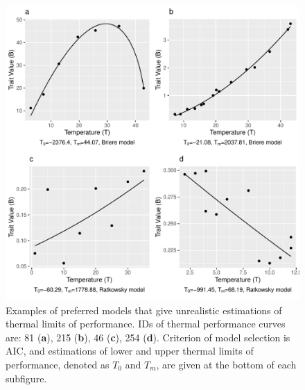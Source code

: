 \documentclass[11pt]{article}
\begin{document}
    \begin{figure}[H]
      \centering
      \includegraphics[width=\textwidth]{../Results/b.pdf}
      \caption{Examples of preferred models that give unrealistic estimations of thermal limits of performance. 
      IDs of thermal performance curves are: 81 (\textbf{a}), 
      215 (\textbf{b}), 46 (\textbf{c}), 254 (\textbf{d}). Criterion of model selection is AIC, and estimations of lower 
      and upper thermal limits of performance, denoted as $T_0$ and $T_m$, are given at the bottom of each subfigure.}
    \end{figure}

  
\end{document}
